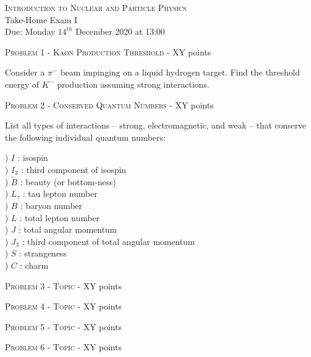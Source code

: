 \documentclass[a4paper,11pt]{report}
\begin{document}
\begin{center}
{\large \textsc{Introduction to Nuclear and Particle Physics}} \\[0.5cm]
\Large{Take-Home Exam I\\
Due: Monday $14^{th}$ December 2020 at 13:00}
\end{center}

{\large \textsc{Problem 1 - Kaon Production Threshold} - XY points}

\noindent Consider a $\pi^-$ beam impinging on a liquid hydrogen target. Find the threshold energy of $K^-$ production assuming strong interactions.
\vspace{0.5cm}

{\large \textsc{Problem 2 - Conserved Quantum Numbers} - XY points}

\noindent List all types of interactions -- strong, electromagnetic, and weak -- that conserve the following individual quantum numbers:

) $I$ : isospin\\
) $I_3$ : third component of isospin\\
) $\widetilde{B}$ : beauty (or bottom-ness)\\
) $L_\tau$ : tau lepton number\\
) $B$ : baryon number\\
) $L$ : total lepton number\\
) $J$ : total angular momentum\\
) $J_3$ : third component of total angular momentum\\
) $S$ : strangeness\\
) $C$ : charm
\vspace{0.5cm}

{\large \textsc{Problem 3 - Topic} - XY points}

{\large \textsc{Problem 4 - Topic} - XY points}

{\large \textsc{Problem 5 - Topic} - XY points}

{\large \textsc{Problem 6 - Topic} - XY points}
\end{document}
